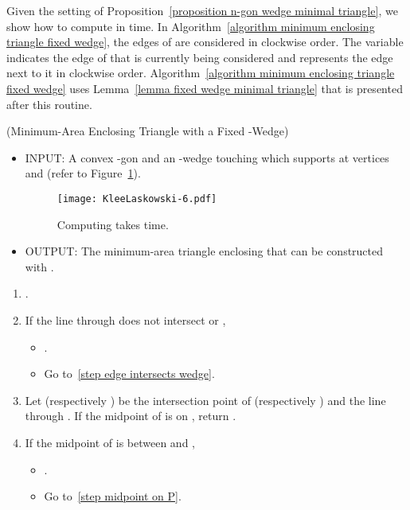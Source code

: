\documentclass[11pt, oneside]{article}
\begin{document}
Given the setting of Proposition~\ref{proposition n-gon wedge minimal triangle},
we show how to compute  in  time.
In Algorithm~\ref{algorithm minimum enclosing triangle fixed wedge},
the edges of  are considered in clockwise order.
The variable  indicates
the edge of 
that is currently being considered
and  represents the edge next to it in clockwise order.
Algorithm~\ref{algorithm minimum enclosing triangle fixed wedge} uses
Lemma~\ref{lemma fixed wedge minimal triangle}
that is presented
after this routine.
\begin{algorithm}(Minimum-Area Enclosing Triangle with a Fixed -Wedge)
\label{algorithm minimum enclosing triangle fixed wedge}
\begin{itemize}
\item INPUT: A convex -gon  
and an -wedge  touching 
which supports  at vertices  and 
(refer to Figure~\ref{figure KleeLaskowski-6}).
\begin{figure}
\centering
\texttt{[image: KleeLaskowski-6.pdf]}
\caption{Computing  takes  time.\label{figure KleeLaskowski-6}}
\end{figure}

\item OUTPUT: The minimum-area triangle enclosing 
that can be constructed with  .
\end{itemize}
\begin{enumerate}
\item .

\item\label{step edge intersects wedge} 
If the line through  does not intersect 
or ,
\begin{itemize}
\item .

\item Go to~\ref{step edge intersects wedge}.
\end{itemize}

\item\label{step midpoint on P}
Let  (respectively )
be the intersection point
of  (respectively )
and the line through .
If the midpoint of 
is on , 
return .

\item If the midpoint of  is between  and ,
\begin{itemize}
\item .

\item Go to~\ref{step midpoint on P}.
\end{itemize}


\end{enumerate}
\end{algorithm}
\end{document}
